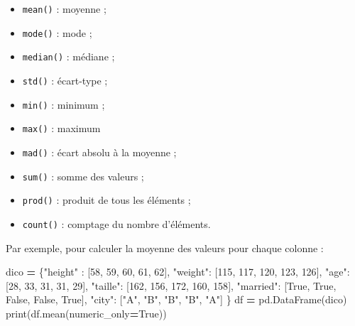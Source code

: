 \documentclass[
  12pt,
]{book}
\newenvironment{Shaded}{\begin{snugshade}}{\end{snugshade}}
\newcommand{\BuiltInTok}[1]{#1}
\newcommand{\DecValTok}[1]{\textcolor[rgb]{0.00,0.00,0.81}{#1}}
\newcommand{\NormalTok}[1]{#1}
\newcommand{\OperatorTok}[1]{\textcolor[rgb]{0.81,0.36,0.00}{\textbf{#1}}}
\newcommand{\StringTok}[1]{\textcolor[rgb]{0.31,0.60,0.02}{#1}}
\newcommand{\VariableTok}[1]{\textcolor[rgb]{0.00,0.00,0.00}{#1}}
\providecommand{\tightlist}{%
  \setlength{\itemsep}{0pt}\setlength{\parskip}{0pt}}
\numberwithin{equation}{section}
\numberwithin{countremarque}{section}
\begin{document}
\begin{itemize}
\tightlist
\item
  \texttt{mean()} : moyenne ;
\item
  \texttt{mode()} : mode ;
\item
  \texttt{median()} : médiane ;
\item
  \texttt{std()} : écart-type ;
\item
  \texttt{min()} : minimum ;
\item
  \texttt{max()} : maximum
\item
  \texttt{mad()} : écart absolu à la moyenne ;
\item
  \texttt{sum()} : somme des valeurs ;
\item
  \texttt{prod()} : produit de tous les éléments ;
\item
  \texttt{count()} : comptage du nombre d'éléments.
\end{itemize}

Par exemple, pour calculer la moyenne des valeurs pour chaque colonne :

\begin{Shaded}
\begin{Highlighting}[]
\NormalTok{dico }\OperatorTok{=}\NormalTok{ \{}\StringTok{"height"}\NormalTok{ : [}\DecValTok{58}\NormalTok{, }\DecValTok{59}\NormalTok{, }\DecValTok{60}\NormalTok{, }\DecValTok{61}\NormalTok{, }\DecValTok{62}\NormalTok{],}
        \StringTok{"weight"}\NormalTok{: [}\DecValTok{115}\NormalTok{, }\DecValTok{117}\NormalTok{, }\DecValTok{120}\NormalTok{, }\DecValTok{123}\NormalTok{, }\DecValTok{126}\NormalTok{],}
        \StringTok{"age"}\NormalTok{: [}\DecValTok{28}\NormalTok{, }\DecValTok{33}\NormalTok{, }\DecValTok{31}\NormalTok{, }\DecValTok{31}\NormalTok{, }\DecValTok{29}\NormalTok{],}
        \StringTok{"taille"}\NormalTok{: [}\DecValTok{162}\NormalTok{, }\DecValTok{156}\NormalTok{, }\DecValTok{172}\NormalTok{, }\DecValTok{160}\NormalTok{, }\DecValTok{158}\NormalTok{],}
        \StringTok{"married"}\NormalTok{: [}\VariableTok{True}\NormalTok{, }\VariableTok{True}\NormalTok{, }\VariableTok{False}\NormalTok{, }\VariableTok{False}\NormalTok{, }\VariableTok{True}\NormalTok{],}
        \StringTok{"city"}\NormalTok{: [}\StringTok{"A"}\NormalTok{, }\StringTok{"B"}\NormalTok{, }\StringTok{"B"}\NormalTok{, }\StringTok{"B"}\NormalTok{, }\StringTok{"A"}\NormalTok{]}
\NormalTok{       \}}
\NormalTok{df }\OperatorTok{=}\NormalTok{ pd.DataFrame(dico)}
\BuiltInTok{print}\NormalTok{(df.mean(numeric\_only}\OperatorTok{=}\VariableTok{True}\NormalTok{))}
\end{Highlighting}
\end{Shaded}
\end{document}
